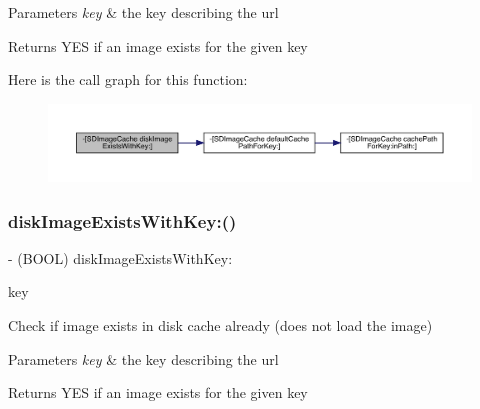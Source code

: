 \begin{DoxyParams}{Parameters}
{\em key} & the key describing the url\\
\hline
\end{DoxyParams}
\begin{DoxyReturn}{Returns}
Y\+ES if an image exists for the given key 
\end{DoxyReturn}
Here is the call graph for this function\+:\nopagebreak
\begin{figure}[H]
\begin{center}
\leavevmode
\includegraphics[width=350pt]{interface_s_d_image_cache_a67feea7b5568f427dfcf4f380abc1ba7_cgraph}
\end{center}
\end{figure}
\mbox{\label{interface_s_d_image_cache_a67feea7b5568f427dfcf4f380abc1ba7}} 
\subsubsection{\texorpdfstring{disk\+Image\+Exists\+With\+Key\+:()}{diskImageExistsWithKey:()}\hspace{0.1cm}{\footnotesize\ttfamily [3/3]}}
{\footnotesize\ttfamily -\/ (B\+O\+OL) disk\+Image\+Exists\+With\+Key\+: \begin{DoxyParamCaption}\item[{(N\+S\+String $\ast$)}]{key }\end{DoxyParamCaption}}

Check if image exists in disk cache already (does not load the image)


\begin{DoxyParams}{Parameters}
{\em key} & the key describing the url\\
\hline
\end{DoxyParams}
\begin{DoxyReturn}{Returns}
Y\+ES if an image exists for the given key 
\end{DoxyReturn}
\mbox{\label{interface_s_d_image_cache_a2baefc1300fcd3c57a25b5326dda8834}} 
